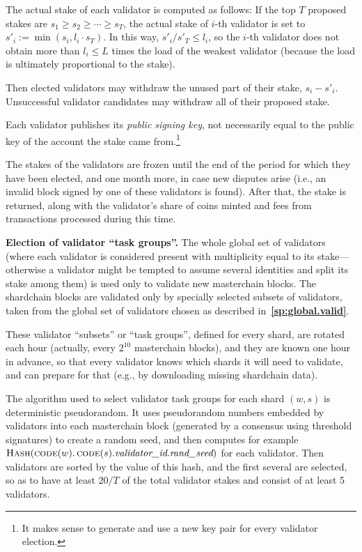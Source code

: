\documentclass[12pt,oneside]{article}
\def\makepoint#1{\medbreak\noindent{\bf #1.\ }}
\def\nxsubpoint{\refstepcounter{subsubsection}%
  \smallbreak\makepoint{\thesubsubsection}}
\def\refpoint#1{{\rm\textbf{\ref{#1}}}}
\let\ptref=\refpoint
\def\embt(#1.){\textbf{#1.}}
\let\vr=\textit
\def\opsc#1{\operatorname{\textsc{#1}}}
\def\Hash{\opsc{Hash}}
\def\code{\opsc{code}}
\begin{document}
The actual stake of each validator is computed as follows: If the top
$T$ proposed stakes are $s_1\geq s_2\geq\cdots\geq s_T$, the actual
stake of $i$-th validator is set to $s'_i:=\min(s_i,l_i\cdot s_T)$. In
this way, $s'_i/s'_T\leq l_i$, so the $i$-th validator does not obtain
more than $l_i\leq L$ times the load of the weakest validator (because
the load is ultimately proportional to the stake).

Then elected validators may withdraw the unused part of their stake,
$s_i-s'_i$. Unsuccessful validator candidates may withdraw all of
their proposed stake.

Each validator publishes its {\em public signing key}, not necessarily
equal to the public key of the account the stake came
from.\footnote{It makes sense to generate and use a new key pair for
  every validator election.}

The stakes of the validators are frozen until the end of the period for
which they have been elected, and one month more, in case new disputes
arise (i.e., an invalid block signed by one of these validators is
found). After that, the stake is returned, along with the validator's
share of coins minted and fees from transactions processed during this
time.

\nxsubpoint\label{sp:val.task.grp} \embt(Election of validator ``task
groups''.)  The whole global set of validators (where each validator
is considered present with multiplicity equal to its stake---otherwise
a validator might be tempted to assume several identities and split
its stake among them) is used only to validate new masterchain
blocks. The shardchain blocks are validated only by specially selected
subsets of validators, taken from the global set of validators chosen
as described in~\ptref{sp:global.valid}.

These validator ``subsets'' or ``task groups'', defined for every
shard, are rotated each hour (actually, every $2^{10}$ masterchain
blocks), and they are known one hour in advance, so that every
validator knows which shards it will need to validate, and can prepare
for that (e.g., by downloading missing shardchain data).

The algorithm used to select validator task groups for each shard
$(w,s)$ is deterministic pseudorandom. It uses pseudorandom numbers
embedded by validators into each masterchain block (generated by a
consensus using threshold signatures) to create a random seed, and
then computes for example
$\Hash(\code(w).\code(s).\vr{validator\_id}.\vr{rand\_seed})$ for each
validator. Then validators are sorted by the value of this hash, and
the first several are selected, so as to have at least $20/T$ of the
total validator stakes and consist of at least 5 validators. 
\end{document}
